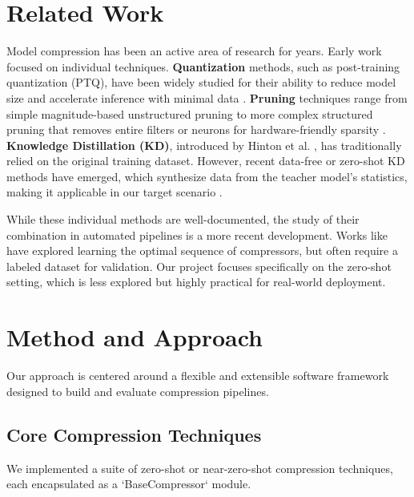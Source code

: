 \documentclass[sigconf]{acmart}
\begin{document}
\section{Related Work}
Model compression has been an active area of research for years. Early work focused on individual techniques. \textbf{Quantization} methods, such as post-training quantization (PTQ), have been widely studied for their ability to reduce model size and accelerate inference with minimal data \cite{geeksforgeeks2025zeroshot}. \textbf{Pruning} techniques range from simple magnitude-based unstructured pruning \cite{peng2020cream} to more complex structured pruning that removes entire filters or neurons for hardware-friendly sparsity \cite{dantas2024comprehensive}. \textbf{Knowledge Distillation (KD)}, introduced by Hinton et al. \cite{merler2025neural}, has traditionally relied on the original training dataset. However, recent data-free or zero-shot KD methods have emerged, which synthesize data from the teacher model's statistics, making it applicable in our target scenario \cite{geeksforgeeks2025zeroshot}.

While these individual methods are well-documented, the study of their combination in automated pipelines is a more recent development. Works like \cite{dantas2024comprehensive} have explored learning the optimal sequence of compressors, but often require a labeled dataset for validation. Our project focuses specifically on the zero-shot setting, which is less explored but highly practical for real-world deployment.

\section{Method and Approach}
Our approach is centered around a flexible and extensible software framework designed to build and evaluate compression pipelines.

\subsection{Core Compression Techniques}
We implemented a suite of zero-shot or near-zero-shot compression techniques, each encapsulated as a `BaseCompressor` module.
\end{document}
